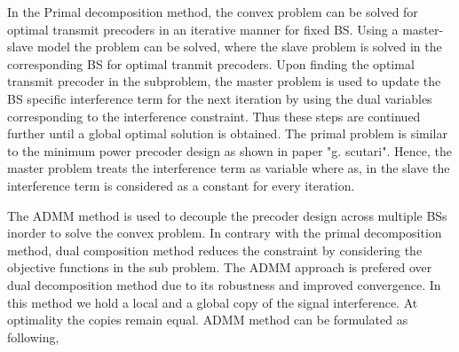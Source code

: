 \documentclass[a4paper, 12pt,titlepage]{dithesis} %
\begin{document}
In the Primal decomposition method, the convex problem can be solved for optimal transmit precoders in an iterative manner for fixed \ac{BS}. Using a master-slave model the problem can be solved, where the slave problem is solved in the corresponding \ac{BS} for optimal tranmit precoders. Upon finding the 
optimal transmit precoder in the subproblem, the master problem is used to update the \ac{BS} specific interference term for the next iteration by using the dual variables corresponding to the interference constraint. Thus these steps are continued further until a global optimal solution is obtained. The primal problem is similar to the minimum power precoder design as shown in paper "g. scutari". Hence, the master problem treats the interference term as variable where as, in the slave the interference term is considered as a constant for every iteration. 


The \ac{ADMM} method is used to decouple the precoder design across multiple \ac{BS}s inorder to solve the convex problem. In contrary with the primal decomposition method,  dual composition method reduces the constraint by considering the objective functions in the sub problem. The \ac{ADMM} approach is prefered over dual decomposition method due to its robustness and improved convergence. In this method we hold a local and a global copy of the signal interference. At optimality the copies remain equal.
\acs{ADMM} method can be formulated as following,
\end{document}

